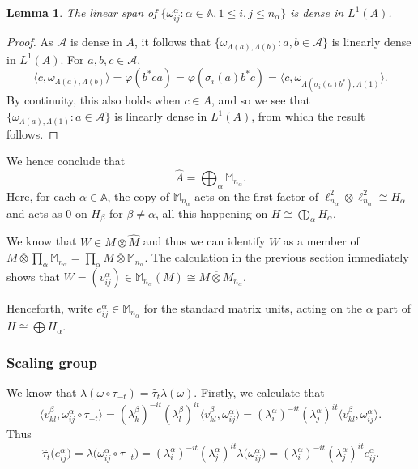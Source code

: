 \documentclass[twoside,a4paper,12pt]{article}
\theoremstyle{plain}
\newtheorem{lemma}[proposition]{Lemma}
\theoremstyle{definition}
\newcommand{\ip}[2]{\langle #1,#2 \rangle}
\newcommand{\mc}{\mathcal}
\newcommand{\vnten}{\overline\otimes}
\begin{document}
\begin{lemma}
The linear span of $\{ \omega^\alpha_{ij} : \alpha\in\mathbb A, 1\leq i,j
\leq n_\alpha \}$ is dense in $L^1(A)$.
\end{lemma}
\begin{proof}
As $\mc A$ is dense in $A$, it follows that $\{ \omega_{\Lambda(a),\Lambda(b)}
: a,b\in\mc A\}$ is linearly dense in $L^1(A)$.  For $a,b,c\in\mc A$,
\[ \ip{c}{\omega_{\Lambda(a),\Lambda(b)}}
= \varphi(b^*ca) = \varphi(\sigma_i(a)b^*c)
= \ip{c}{\omega_{\Lambda(\sigma_i(a)b^*),\Lambda(1)}}. \]
By continuity, this also holds when $c\in A$, and so we see that
$\{ \omega_{\Lambda(a),\Lambda(1)} : a\in\mc A\}$ is linearly dense in
$L^1(A)$, from which the result follows.
\end{proof}

We hence conclude that
\[ \hat A = \bigoplus_\alpha \mathbb M_{n_\alpha}. \]
Here, for each $\alpha\in\mathbb A$, the copy of $\mathbb M_{n_\alpha}$ acts
on the first factor of $\ell^2_{n_\alpha} \otimes \ell^2_{n_\alpha}
\cong H_\alpha$ and acts as $0$ on $H_\beta$ for $\beta\not=\alpha$, all
this happening on $H \cong \bigoplus_\alpha H_\alpha$.

We know that $W \in M \vnten \hat M$ and thus we can identify
$W$ as a member of $M\vnten\prod_\alpha \mathbb M_{n_\alpha}
= \prod_\alpha M\vnten \mathbb M_{n_\alpha}$.  The calculation in the previous
section immediately shows that $W = (v^\alpha_{ij}) \in
\mathbb M_{n_\alpha}(M) \cong M\vnten M_{n_\alpha}$.

Henceforth, write $e^\alpha_{ij} \in \mathbb M_{n_\alpha}$ for the
standard matrix units, acting on the $\alpha$ part of $H\cong
\bigoplus H_\alpha$.


\subsubsection{Scaling group}

We know that $\lambda(\omega\circ\tau_{-t}) = \hat\tau_t\lambda(\omega)$.
Firstly, we calculate that
\[ \ip{v^\beta_{kl}}{\omega^\alpha_{ij}\circ\tau_{-t}}
= (\lambda^\beta_k)^{-it} (\lambda^\beta_l)^{it}
\ip{v^\beta_{kl}}{\omega^\alpha_{ij}}
= (\lambda^\alpha_i)^{-it} (\lambda^\alpha_j)^{it}
\ip{v^\beta_{kl}}{\omega^\alpha_{ij}}. \]
Thus
\[ \hat\tau_t\big( e^\alpha_{ij} \big)
= \lambda\big( \omega^\alpha_{ij} \circ \tau_{-t} \big)
= (\lambda^\alpha_i)^{-it} (\lambda^\alpha_j)^{it}
\lambda\big( \omega^\alpha_{ij} \big)
= (\lambda^\alpha_i)^{-it} (\lambda^\alpha_j)^{it} e^\alpha_{ij}. \]
\end{document}
